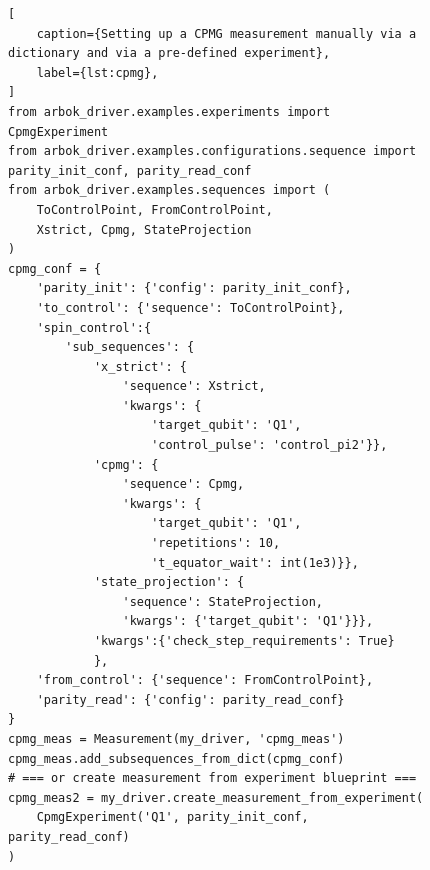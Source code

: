 \documentclass[numbers, preprint, twocolumn,10pt]{elsarticle}
\begin{document}
\begin{figure}[t]
\begin{lstlisting}[
    caption={Setting up a CPMG measurement manually via a dictionary and via a pre-defined experiment},
    label={lst:cpmg},
]
from arbok_driver.examples.experiments import CpmgExperiment
from arbok_driver.examples.configurations.sequence import parity_init_conf, parity_read_conf
from arbok_driver.examples.sequences import (
    ToControlPoint, FromControlPoint,
    Xstrict, Cpmg, StateProjection
)
cpmg_conf = {
    'parity_init': {'config': parity_init_conf},
    'to_control': {'sequence': ToControlPoint},
    'spin_control':{
        'sub_sequences': {
            'x_strict': {
                'sequence': Xstrict,
                'kwargs': {
                    'target_qubit': 'Q1',
                    'control_pulse': 'control_pi2'}},
            'cpmg': {
                'sequence': Cpmg,
                'kwargs': {
                    'target_qubit': 'Q1',
                    'repetitions': 10,
                    't_equator_wait': int(1e3)}},
            'state_projection': {
                'sequence': StateProjection,
                'kwargs': {'target_qubit': 'Q1'}}},
            'kwargs':{'check_step_requirements': True}
            },
    'from_control': {'sequence': FromControlPoint},
    'parity_read': {'config': parity_read_conf}
}
cpmg_meas = Measurement(my_driver, 'cpmg_meas')
cpmg_meas.add_subsequences_from_dict(cpmg_conf)
# === or create measurement from experiment blueprint ===
cpmg_meas2 = my_driver.create_measurement_from_experiment(
    CpmgExperiment('Q1', parity_init_conf, parity_read_conf)
)
\end{lstlisting}
\end{figure}
\end{document}
